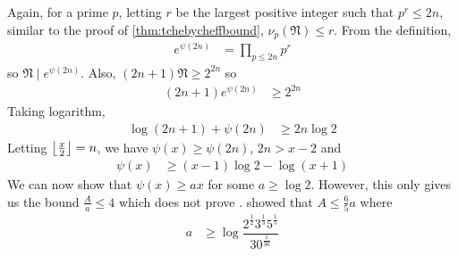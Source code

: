 \documentclass[elemannt.tex]{subfile}
\begin{document}
			Again, for a prime $p$, letting $r$ be the largest positive integer such that $p^{r}\leq 2n$, similar to the proof of \autoref{thm:tchebycheffbound}, $\nu_{p}(\mathfrak{N})\leq r$. From the definition,
				\begin{align*}
					e^{\psi(2n)}
						& = \prod_{p\leq 2n}p^{r}
				\end{align*}
			so $\mathfrak{N}\mid e^{\psi(2n)}$. Also, $(2n+1)\mathfrak{N}\geq 2^{2n}$ so
				\begin{align*}
					(2n+1)e^{\psi(2n)}
						& \geq 2^{2n}
				\end{align*}
			Taking logarithm,
				\begin{align*}
					\log{(2n+1)}+\psi(2n)
						& \geq 2n\log{2}
				\end{align*}
			Letting $\floor{\frac{x}{2}}=n$, we have $\psi(x)\geq\psi(2n)$, $2n>x-2$ and
				\begin{align*}
					\psi(x)
						& \geq (x-1)\log{2}-\log{(x+1)}
				\end{align*}
	We can now show that $\psi(x)\geq ax$ for some $a\geq\log{2}$. However, this only gives us the bound $\frac{A}{a}\leq4$ which does not prove . \textcite[$\S4$, eqn. $(5)$ pp. 376]{tschebischeff_1852} showed that $A\leq\frac{6}{5}a$ where
		\begin{align*}
			a
				& \geq \log{\dfrac{2^{\frac{1}{2}}3^{\frac{1}{3}}5^{\frac{1}{5}}}{30^{\frac{1}{30}}}}
		\end{align*}
\end{document}
